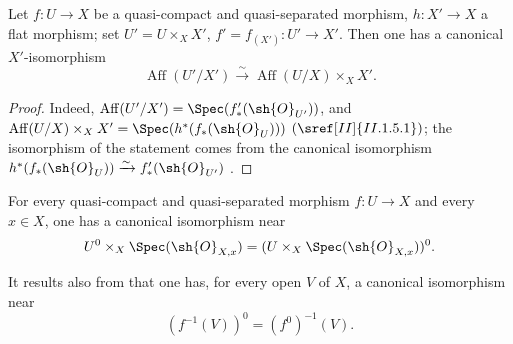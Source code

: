 \begin{proposition}[21.12.2]
\label{IV.21.12.2}
Let $f:U\to X$ be a quasi-compact and quasi-separated morphism, $h:X'\to X$ a flat morphism;
set $U'=U\times_X X'$, $f'=f_{(X')}:U'\to X'$.
Then one has a canonical $X'$-isomorphism
\[
\label{IV.21.12.2.1}
  \operatorname{Aff}(U'/X')\xrightarrow{\sim}\operatorname{Aff}(U/X)\times_X X'.
  \tag{21.12.2.1}
\]
\end{proposition}

\begin{proof}
Indeed, $\operatorname{Aff}(U'/X')=\Spec(f'_*(\sh{O}_{U'}))$, and $\operatorname{Aff}(U/X)\times_X X'=\Spec(h^*(f_*(\sh{O}_U)))$ $(\sref[II]{II.1.5.1})$;
the isomorphism of the statement comes from the canonical isomorphism $h^*(f_*(\sh{O}_U))\xrightarrow{\sim}f'_*(\sh{O}_{U'})$ .
\end{proof}

\begin{corollary}[21.12.3]
\label{IV.21.12.3}
For every quasi-compact and quasi-separated morphism $f:U\to X$ and every $x\in X$, one has a canonical isomorphism near
\[
  U^0\times_X\Spec(\sh{O}_{X,x})=(U\times_X\Spec(\sh{O}_{X,x}))^0.
\]
\end{corollary}

It results also from  that one has, for every open $V$ of $X$, a canonical isomorphism near
\[
\label{IV.21.12.4}
  (f^{-1}(V))^0=(f^0)^{-1}(V).
  \tag{21.12.4}
\]

